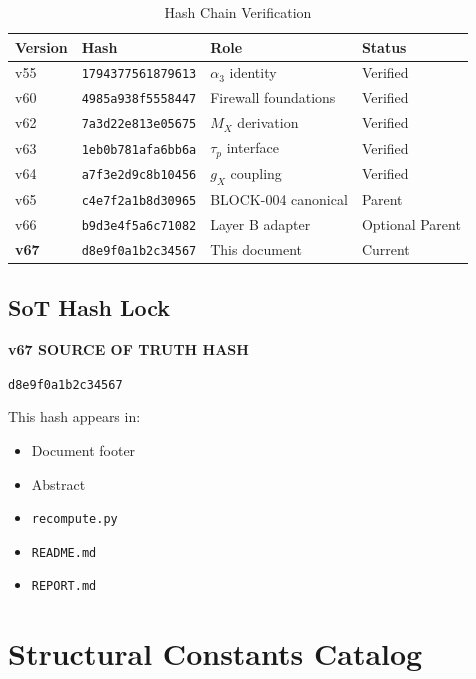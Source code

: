 \documentclass[11pt,letterpaper]{article}
\begin{document}
\begin{table}[h!]
\centering
\caption{Hash Chain Verification}
\label{tab:hash-chain}
\begin{tabular}{llll}
\toprule
Version & Hash & Role & Status \\
\midrule
v55 & \texttt{1794377561879613} & $\alpha_3$ identity & Verified \\
v60 & \texttt{4985a938f5558447} & Firewall foundations & Verified \\
v62 & \texttt{7a3d22e813e05675} & $M_X$ derivation & Verified \\
v63 & \texttt{1eb0b781afa6bb6a} & $\tau_p$ interface & Verified \\
v64 & \texttt{a7f3e2d9c8b10456} & $g_X$ coupling & Verified \\
v65 & \texttt{c4e7f2a1b8d30965} & BLOCK-004 canonical & Parent \\
v66 & \texttt{b9d3e4f5a6c71082} & Layer B adapter & Optional Parent \\
\textbf{v67} & \texttt{d8e9f0a1b2c34567} & This document & Current \\
\bottomrule
\end{tabular}
\end{table}

\subsection{SoT Hash Lock}
\label{subsec:sot-hash}

\begin{hashbox}
\textbf{v67 SOURCE OF TRUTH HASH}

\begin{center}
\texttt{d8e9f0a1b2c34567}
\end{center}

This hash appears in:
\begin{itemize}[noitemsep]
\item Document footer
\item Abstract
\item \texttt{recompute.py}
\item \texttt{README.md}
\item \texttt{REPORT.md}
\end{itemize}
\end{hashbox}

\section{Structural Constants Catalog}
\label{sec:constants}
\end{document}
